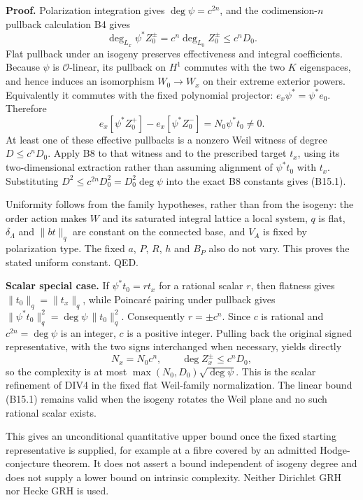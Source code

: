 \documentclass[11pt,a4paper]{article}
\theoremstyle{definition}
\begin{document}
\textbf{Proof.} Polarization integration gives \(\deg\psi=c^{2n}\), and the codimension-\(n\) pullback calculation B4 gives \[
 \deg_{L_x}\psi^*Z_0^\pm
 =c^n\deg_{L_0}Z_0^\pm
 \le c^nD_0.
\] Flat pullback under an isogeny preserves effectiveness and integral coefficients. Because \(\psi\) is \(\mathcal O\)-linear, its pullback on \(H^1\) commutes with the two \(K\) eigenspaces, and hence induces an isomorphism \(W_0\to W_x\) on their extreme exterior powers. Equivalently it commutes with the fixed polynomial projector: \(e_x\psi^*=\psi^*e_0\). Therefore \[
 e_x[\psi^*Z_0^+]-e_x[\psi^*Z_0^-]
 =N_0\psi^*t_0\ne0.
\] At least one of these effective pullbacks is a nonzero Weil witness of degree \(D\le c^nD_0\). Apply B8 to that witness and to the prescribed target \(t_x\), using its two-dimensional extraction rather than assuming alignment of \(\psi^*t_0\) with \(t_x\). Substituting \(D^2\le c^{2n}D_0^2=D_0^2\deg\psi\) into the exact B8 constants gives (B15.1).

Uniformity follows from the family hypotheses, rather than from the isogeny: the order action makes \(W\) and its saturated integral lattice a local system, \(q\) is flat, \(\delta_\Lambda\) and \(\|bt\|_q\) are constant on the connected base, and \(V_A\) is fixed by polarization type. The fixed \(a\), \(P\), \(R\), \(h\) and \(B_P\) also do not vary. This proves the stated uniform constant. QED.

\textbf{Scalar special case.} If \(\psi^*t_0=r t_x\) for a rational scalar \(r\), then flatness gives \(\|t_0\|_q=\|t_x\|_q\), while Poincaré pairing under pullback gives \(\|\psi^*t_0\|_q^2=\deg\psi\,\|t_0\|_q^2\). Consequently \(r=\pm c^n\). Since \(c\) is rational and \(c^{2n}=\deg\psi\) is an integer, \(c\) is a positive integer. Pulling back the original signed representative, with the two signs interchanged when necessary, yields directly \[
 N_x=N_0c^n,\qquad
 \deg Z_x^\pm\le c^nD_0,
\] so the complexity is at most \(\max(N_0,D_0)\sqrt{\deg\psi}\). This is the scalar refinement of DIV4 in the fixed flat Weil-family normalization. The linear bound (B15.1) remains valid when the isogeny rotates the Weil plane and no such rational scalar exists.

This gives an unconditional quantitative upper bound once the fixed starting representative is supplied, for example at a fibre covered by an admitted Hodge-conjecture theorem. It does not assert a bound independent of isogeny degree and does not supply a lower bound on intrinsic complexity. Neither Dirichlet GRH nor Hecke GRH is used.
\end{document}
